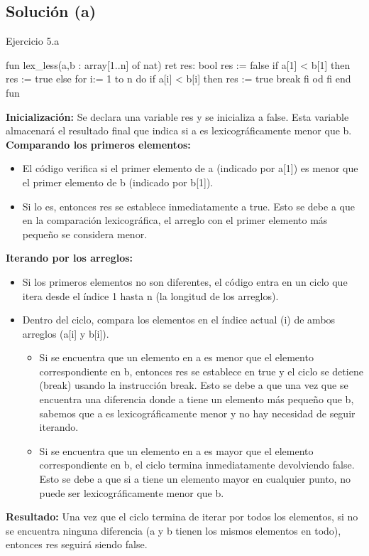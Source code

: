 \subsection{Solución (a)}
\begin{codebox}{Ejercicio 5.a}
\begin{pascallike}
fun lex_less(a,b : array[1..n] of nat) ret res: bool
res := false
if a[1] < b[1] then
    res := true
else
    for i:= 1 to n do
        if a[i] < b[i] then
            res := true
            break
        fi
    od
fi
end fun
\end{pascallike}
\end{codebox}
\textbf{Inicialización:} Se declara una variable res y se inicializa a false. Esta variable almacenará el resultado final que indica si a es lexicográficamente menor que b.
\textbf{Comparando los primeros elementos:} 
\begin{itemize}
    \item El código verifica si el primer elemento de a (indicado por a[1]) es menor que el primer elemento de b (indicado por b[1]).
    \item Si lo es, entonces res se establece inmediatamente a true. Esto se debe a que en la comparación lexicográfica, el arreglo con el primer elemento más pequeño se considera menor.
\end{itemize}
\textbf{Iterando por los arreglos:} 
\begin{itemize}
    \item Si los primeros elementos no son diferentes, el código entra en un ciclo que itera desde el índice 1 hasta n (la longitud de los arreglos).
    \item Dentro del ciclo, compara los elementos en el índice actual (i) de ambos arreglos (a[i] y b[i]).
    \begin{itemize}
        \item Si se encuentra que un elemento en a es menor que el elemento correspondiente en b, entonces res se establece en true y el ciclo se detiene (break) usando la instrucción break. Esto se debe a que una vez que se encuentra una diferencia donde a tiene un elemento más pequeño que b, sabemos que a es lexicográficamente menor y no hay necesidad de seguir iterando.
        \item Si se encuentra que un elemento en a es mayor que el elemento correspondiente en b, el ciclo termina inmediatamente devolviendo false. Esto se debe a que si a tiene un elemento mayor en cualquier punto, no puede ser lexicográficamente menor que b.
    \end{itemize}
\end{itemize}
\textbf{Resultado:} Una vez que el ciclo termina de iterar por todos los elementos, si no se encuentra ninguna diferencia (a y b tienen los mismos elementos en todo), entonces res seguirá siendo false.

